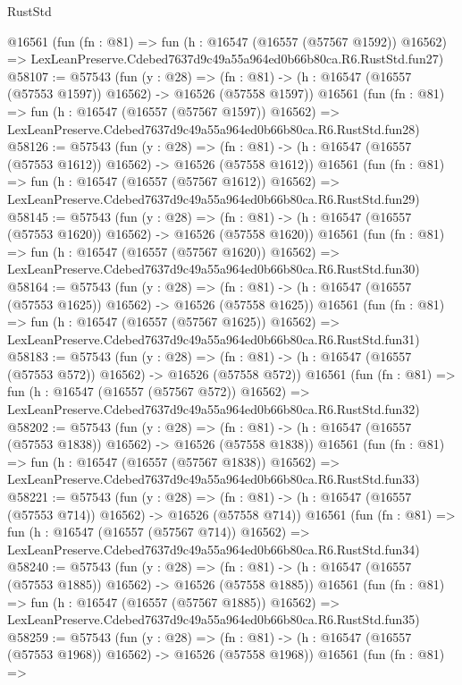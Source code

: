 \begin{lexlean}{RustStd}
\begin{coremodule}
    @16561
    (fun (fn : @81) =>
    fun (h : @16547 (@16557 (@57567 @1592)) @16562) =>
    LexLeanPreserve.Cdebed7637d9c49a55a964ed0b66b80ca.R6.RustStd.fun27)
@58107 := @57543
    (fun (y : @28) =>
    (fn : @81) -> (h : @16547 (@16557 (@57553 @1597)) @16562) -> @16526 (@57558 @1597))
    @16561
    (fun (fn : @81) =>
    fun (h : @16547 (@16557 (@57567 @1597)) @16562) =>
    LexLeanPreserve.Cdebed7637d9c49a55a964ed0b66b80ca.R6.RustStd.fun28)
@58126 := @57543
    (fun (y : @28) =>
    (fn : @81) -> (h : @16547 (@16557 (@57553 @1612)) @16562) -> @16526 (@57558 @1612))
    @16561
    (fun (fn : @81) =>
    fun (h : @16547 (@16557 (@57567 @1612)) @16562) =>
    LexLeanPreserve.Cdebed7637d9c49a55a964ed0b66b80ca.R6.RustStd.fun29)
@58145 := @57543
    (fun (y : @28) =>
    (fn : @81) -> (h : @16547 (@16557 (@57553 @1620)) @16562) -> @16526 (@57558 @1620))
    @16561
    (fun (fn : @81) =>
    fun (h : @16547 (@16557 (@57567 @1620)) @16562) =>
    LexLeanPreserve.Cdebed7637d9c49a55a964ed0b66b80ca.R6.RustStd.fun30)
@58164 := @57543
    (fun (y : @28) =>
    (fn : @81) -> (h : @16547 (@16557 (@57553 @1625)) @16562) -> @16526 (@57558 @1625))
    @16561
    (fun (fn : @81) =>
    fun (h : @16547 (@16557 (@57567 @1625)) @16562) =>
    LexLeanPreserve.Cdebed7637d9c49a55a964ed0b66b80ca.R6.RustStd.fun31)
@58183 := @57543
    (fun (y : @28) =>
    (fn : @81) -> (h : @16547 (@16557 (@57553 @572)) @16562) -> @16526 (@57558 @572))
    @16561
    (fun (fn : @81) =>
    fun (h : @16547 (@16557 (@57567 @572)) @16562) =>
    LexLeanPreserve.Cdebed7637d9c49a55a964ed0b66b80ca.R6.RustStd.fun32)
@58202 := @57543
    (fun (y : @28) =>
    (fn : @81) -> (h : @16547 (@16557 (@57553 @1838)) @16562) -> @16526 (@57558 @1838))
    @16561
    (fun (fn : @81) =>
    fun (h : @16547 (@16557 (@57567 @1838)) @16562) =>
    LexLeanPreserve.Cdebed7637d9c49a55a964ed0b66b80ca.R6.RustStd.fun33)
@58221 := @57543
    (fun (y : @28) =>
    (fn : @81) -> (h : @16547 (@16557 (@57553 @714)) @16562) -> @16526 (@57558 @714))
    @16561
    (fun (fn : @81) =>
    fun (h : @16547 (@16557 (@57567 @714)) @16562) =>
    LexLeanPreserve.Cdebed7637d9c49a55a964ed0b66b80ca.R6.RustStd.fun34)
@58240 := @57543
    (fun (y : @28) =>
    (fn : @81) -> (h : @16547 (@16557 (@57553 @1885)) @16562) -> @16526 (@57558 @1885))
    @16561
    (fun (fn : @81) =>
    fun (h : @16547 (@16557 (@57567 @1885)) @16562) =>
    LexLeanPreserve.Cdebed7637d9c49a55a964ed0b66b80ca.R6.RustStd.fun35)
@58259 := @57543
    (fun (y : @28) =>
    (fn : @81) -> (h : @16547 (@16557 (@57553 @1968)) @16562) -> @16526 (@57558 @1968))
    @16561
    (fun (fn : @81) =>

\end{coremodule}
\end{lexlean}
